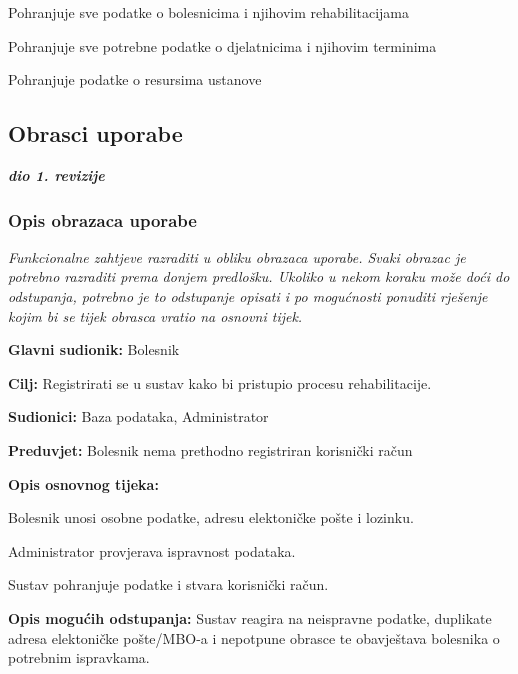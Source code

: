 \begin{packed_enum}
\begin{packed_enum}
	\end{packed_enum}

	\item {}

	\begin{packed_enum}

		\item Pohranjuje sve podatke o bolesnicima i njihovim rehabilitacijama
		\item Pohranjuje sve potrebne podatke o djelatnicima i njihovim terminima
        \item Pohranjuje podatke o resursima ustanove 

	\end{packed_enum}
\end{packed_enum}

\eject



\subsection{Obrasci uporabe}

\textbf{\textit{dio 1. revizije}}

\subsubsection{Opis obrazaca uporabe}
\textit{Funkcionalne zahtjeve razraditi u obliku obrazaca uporabe. Svaki obrazac je potrebno razraditi prema donjem predlošku. Ukoliko u nekom koraku može doći do odstupanja, potrebno je to odstupanje opisati i po mogućnosti ponuditi rješenje kojim bi se tijek obrasca vratio na osnovni tijek.}
\vspace{2em} %

	\item \textbf{Glavni sudionik:} Bolesnik
	\item \textbf{Cilj:} Registrirati se u sustav kako bi pristupio procesu rehabilitacije.
	\item \textbf{Sudionici:} Baza podataka, Administrator
	\item \textbf{Preduvjet:} Bolesnik nema prethodno registriran korisnički račun
	\item \textbf{Opis osnovnog tijeka:}
	\begin{packed_enum}
		\item Bolesnik unosi osobne podatke, adresu elektoničke pošte i lozinku.
		\item Administrator provjerava ispravnost podataka.
		\item Sustav pohranjuje podatke i stvara korisnički račun.
	\end{packed_enum}
	\item \textbf{Opis mogućih odstupanja:}
	Sustav reagira na neispravne podatke, duplikate adresa elektoničke pošte/MBO-a i nepotpune
	obrasce te obavještava bolesnika o potrebnim ispravkama. \\
\closeusecase

